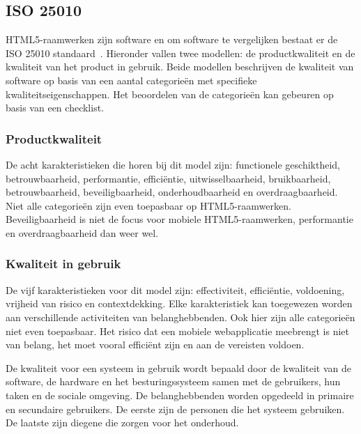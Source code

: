 \subsection{ISO 25010}
\label{sec:vergelijken-iso}

HTML5-raamwerken zijn software en om software te vergelijken bestaat er de ISO 25010 standaard~\cite{Standard2010}.  
Hieronder vallen twee modellen:  de productkwaliteit en de kwaliteit van het product in gebruik.  
Beide modellen beschrijven de kwaliteit van software op basis van een aantal categorieën met specifieke kwaliteitseigenschappen. 
Het beoordelen van de categorieën kan gebeuren op basis van een checklist. 
 
\subsubsection{Productkwaliteit}
De acht karakteristieken die horen bij dit model zijn: functionele geschiktheid,  betrouwbaarheid,  performantie, efficiëntie, uitwisselbaarheid,  bruikbaarheid,  betrouwbaarheid, beveiligbaarheid,  onderhoudbaarheid en overdraagbaarheid.   
Niet alle categorieën zijn even toepasbaar op HTML5-raamwerken.  
Beveiligbaarheid is niet de focus voor mobiele HTML5-raamwerken,  performantie en overdraagbaarheid dan weer wel.

\subsubsection{Kwaliteit in gebruik}
De vijf karakteristieken voor dit model zijn: effectiviteit,  efficiëntie,  voldoening,  vrijheid van risico en contextdekking. 
Elke karakteristiek kan toegewezen worden aan verschillende activiteiten van belanghebbenden. 
Ook hier zijn alle categorieën niet even toepasbaar.  
Het risico dat een mobiele webapplicatie meebrengt is niet van belang,  het moet vooral efficiënt zijn en aan de vereisten voldoen.

De kwaliteit voor een systeem in gebruik wordt bepaald door de kwaliteit van de software,  de hardware en het besturingssysteem samen met de gebruikers, hun taken en de sociale omgeving.  
De belanghebbenden worden opgedeeld in primaire en secundaire gebruikers.  
De eerste zijn de personen die het systeem gebruiken. 
De laatste zijn diegene die zorgen voor het onderhoud.


